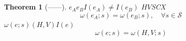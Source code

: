 \documentclass[11pt,a4paper]{article}
\newtheorem{theorem}{Theorem}[section]
\theoremstyle{remark}
\newcommand{\Sstates}{\mathcal{S}}
\begin{document}
\subsection{}

\begin{theorem}[——]
\label{thm:equality}
$e_A$$e_B$$I(e_A) \neq I(e_B)$
$H$$V$SCX
\begin{equation}
    \boxed{\omega(e_A; s) = \omega(e_B; s), \quad \forall s \in \Sstates}
\end{equation}
$\omega(e; s)$$(H, V)$$I(e)$
\begin{equation}
    \omega(e; s) = \omega(H, V; s)
\end{equation}
\end{theorem}

\subsection{}
\end{document}
